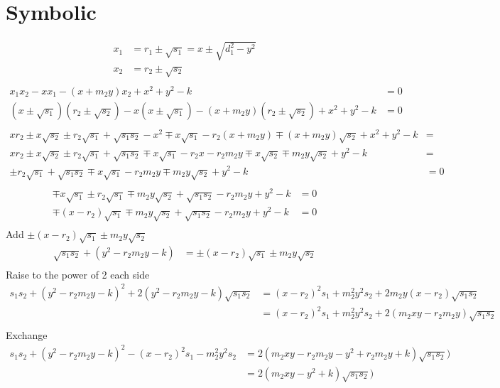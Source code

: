 \documentclass[11pt]{article}
\begin{document}
\section{Symbolic}
\begin{align*}
  x_1 &= r_1 \pm \sqrt{s_1} = x \pm \sqrt{d_1^2 - y^2}\\
  x_2 &= r_2 \pm \sqrt{s_2}\\
\end{align*}
\begin{align*}
  x_1 x_2 - x x_1 - (x + m_2 y) x_2 + x^2 + y^2 - k &= 0\\
  (x \pm \sqrt{s_1}) (r_2 \pm \sqrt{s_2}) - x (x \pm \sqrt{s_1}) - (x + m_2 y) (r_2 \pm \sqrt{s_2}) + x^2 + y^2 - k &= 0\\
\end{align*}
\begin{align*}
  x r_2 \pm x \sqrt{s_2} \pm r_2 \sqrt{s_1} + \sqrt{s_1 s_2} - x^2 \mp x\sqrt{s_1} - r_2 (x + m_2 y) \mp (x + m_2 y)\sqrt{s_2} + x^2 + y^2 - k &= \\
  x r_2 \pm x \sqrt{s_2} \pm r_2 \sqrt{s_1} + \sqrt{s_1 s_2} \mp x\sqrt{s_1} - r_2 x - r_2 m_2 y \mp x \sqrt{s_2} \mp m_2 y\sqrt{s_2}  + y^2 - k &= \\
  \pm r_2 \sqrt{s_1} + \sqrt{s_1 s_2} \mp x\sqrt{s_1} - r_2 m_2 y \mp m_2 y\sqrt{s_2}  + y^2 - k &= 0\\
\end{align*}
\begin{align*}
  \mp x\sqrt{s_1} \pm r_2 \sqrt{s_1} \mp m_2 y \sqrt{s_2} + \sqrt{s_1 s_2} - r_2 m_2 y + y^2 - k &= 0\\
  \mp (x - r_2) \sqrt{s_1} \mp m_2 y \sqrt{s_2} + \sqrt{s_1 s_2} - r_2 m_2 y + y^2 - k &= 0\\
\end{align*}
Add $\pm (x - r_2) \sqrt{s_1} \pm m_2 y \sqrt{s_2}$
\begin{align*}
  \sqrt{s_1 s_2} + (y^2 - r_2 m_2 y - k) &= \pm (x - r_2) \sqrt{s_1} \pm m_2 y \sqrt{s_2}\\
\end{align*}
Raise to the power of 2 each side
\begin{align*}
  s_1 s_2 + (y^2 - r_2 m_2 y - k)^2 + 2 (y^2 - r_2 m_2 y - k) \sqrt{s_1 s_2}
  &= (x - r_2)^2 s_1 + m_2^2 y^2 s_2 + 2 m_2 y (x - r_2) \sqrt{s_1 s_2}\\
  &= (x - r_2)^2 s_1 + m_2^2 y^2 s_2 + 2 (m_2 x y - r_2 m_2 y) \sqrt{s_1 s_2}\\
\end{align*}
Exchange
\begin{align*}
  s_1 s_2 + (y^2 - r_2 m_2 y - k)^2 - (x - r_2)^2 s_1 - m_2^2 y^2 s_2
  &= 2 (m_2 x y - r_2 m_2 y - y^2 + r_2 m_2 y + k) \sqrt{s_1 s_2})\\
  &= 2 (m_2 x y - y^2 + k) \sqrt{s_1 s_2})\\
\end{align*}
\end{document}
